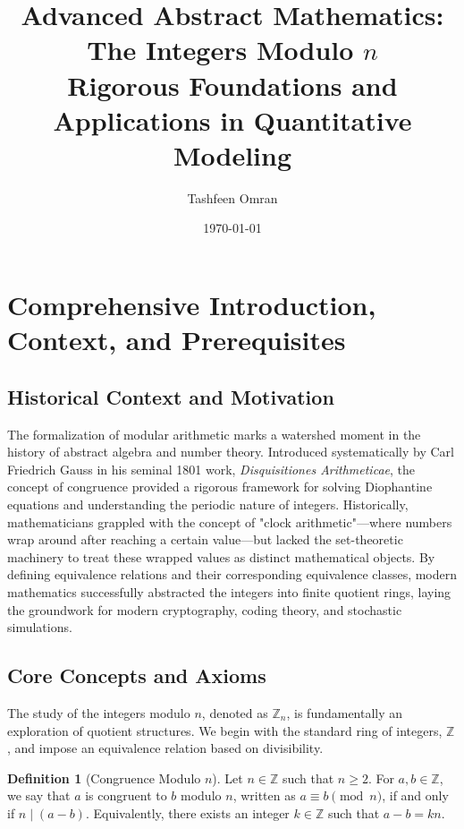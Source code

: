 \documentclass[11pt, a4paper]{article}
\theoremstyle{definition}
\newtheorem{definition}{Definition}[section]
\theoremstyle{remark}
\newcommand{\Z}{\mathbb{Z}}
\begin{document}
\title{\textbf{Advanced Abstract Mathematics: The Integers Modulo $n$}\\ \Large Rigorous Foundations and Applications in Quantitative Modeling}
\author{Tashfeen Omran}
\date{\today}
\maketitle

\tableofcontents
\newpage

\section{Comprehensive Introduction, Context, and Prerequisites}

\subsection{Historical Context and Motivation}
The formalization of modular arithmetic marks a watershed moment in the history of abstract algebra and number theory. Introduced systematically by Carl Friedrich Gauss in his seminal 1801 work, \textit{Disquisitiones Arithmeticae}, the concept of congruence provided a rigorous framework for solving Diophantine equations and understanding the periodic nature of integers. Historically, mathematicians grappled with the concept of "clock arithmetic"—where numbers wrap around after reaching a certain value—but lacked the set-theoretic machinery to treat these wrapped values as distinct mathematical objects. By defining equivalence relations and their corresponding equivalence classes, modern mathematics successfully abstracted the integers into finite quotient rings, laying the groundwork for modern cryptography, coding theory, and stochastic simulations.

\subsection{Core Concepts and Axioms}
The study of the integers modulo $n$, denoted as $\Z_n$, is fundamentally an exploration of quotient structures. We begin with the standard ring of integers, $\Z$, and impose an equivalence relation based on divisibility.

\begin{definition}[Congruence Modulo $n$]
Let $n \in \Z$ such that $n \ge 2$. For $a, b \in \Z$, we say that $a$ is congruent to $b$ modulo $n$, written as $a \equiv b \pmod n$, if and only if $n \mid (a - b)$. Equivalently, there exists an integer $k \in \Z$ such that $a - b = kn$.
\end{definition}
\end{document}
